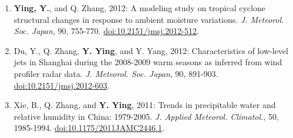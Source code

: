 \begin{enumerate}
\item \textbf{Ying, Y.}, and Q. Zhang, 2012: A modeling study on tropical cyclone structural changes in response to ambient moisture variations. 
\textit{J. Meteorol. Soc. Japan}, 90, 755-770. 
\href{https://doi.org/10.2151/jmsj.2012-512}{doi:10.2151/jmsj.2012-512}.

\item Du, Y., Q. Zhang, \textbf{Y. Ying}, and Y. Yang, 2012: Characteristics of low-level jets in Shanghai during the 2008-2009 warm seasons as inferred from wind profiler radar data. 
\textit{J. Meteorol. Soc. Japan}, 90, 891-903. 
\href{https://doi.org/10.2151/jmsj.2012-603}{doi:10.2151/jmsj.2012-603}.

\item Xie, B., Q. Zhang, and \textbf{Y. Ying}, 2011: Trends in precipitable water and relative humidity in China: 1979-2005. 
\textit{J. Applied Meteorol. Climatol.}, 50, 1985-1994. 
\href{https://doi.org/10.1175/2011JAMC2446.1}{doi:10.1175/2011JAMC2446.1}.

\end{enumerate}
